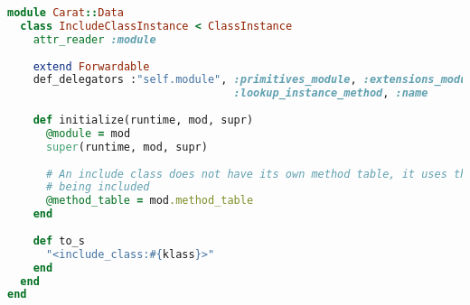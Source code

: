 \begin{lstlisting}[title={\small\ttfamily\bfseries data/include\_class.rb},language=Ruby]
module Carat::Data
  class IncludeClassInstance < ClassInstance
    attr_reader :module
    
    extend Forwardable
    def_delegators :"self.module", :primitives_module, :extensions_module,
                                   :lookup_instance_method, :name
    
    def initialize(runtime, mod, supr)
      @module = mod
      super(runtime, mod, supr)
      
      # An include class does not have its own method table, it uses the method table of the module
      # being included
      @method_table = mod.method_table
    end
    
    def to_s
      "<include_class:#{klass}>"
    end
  end
end

\end{lstlisting}
